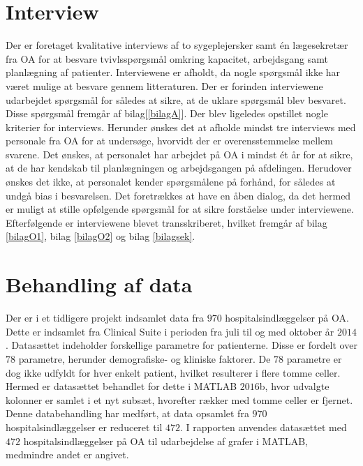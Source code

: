 \section{Interview}
Der er foretaget kvalitative interviews af to sygeplejersker samt én lægesekretær fra OA for at besvare tvivlsspørgsmål omkring kapacitet, arbejdsgang samt planlægning af patienter. Interviewene er afholdt, da nogle spørgsmål ikke har været mulige at besvare gennem litteraturen. Der er forinden interviewene udarbejdet spørgsmål for således at sikre, at de uklare spørgsmål blev besvaret. Disse spørgsmål fremgår af bilag[\ref{bilagA}]. Der blev ligeledes opstillet nogle kriterier for interviews. Herunder ønskes det at afholde mindst tre interviews med personale fra OA for at undersøge, hvorvidt der er overensstemmelse mellem svarene. Det ønskes, at personalet har arbejdet på OA i mindst ét år for at sikre, at de har kendskab til planlægningen og arbejdsgangen på afdelingen. Herudover ønskes det ikke, at personalet kender spørgsmålene på forhånd, for således at undgå bias i besvarelsen. Det foretrækkes at have en åben dialog, da det hermed er muligt at stille opfølgende spørgsmål for at sikre forståelse under interviewene. Efterfølgende er interviewene blevet transskriberet, hvilket fremgår af bilag \ref{bilagO1}, bilag \ref{bilagO2} og bilag \ref{bilagsek}.


\section{Behandling af data}
Der er i et tidligere projekt indsamlet data fra $970$ hospitalsindlæggelser på OA. Dette er indsamlet fra Clinical Suite i perioden fra juli til og med oktober år $2014$. Datasættet indeholder forskellige parametre for patienterne. Disse er fordelt over $78$ parametre, herunder demografiske- og kliniske faktorer. De $78$ parametre er dog ikke udfyldt for hver enkelt patient, hvilket resulterer i flere tomme celler. Hermed er datasættet behandlet for dette i MATLAB $2016$b, hvor udvalgte kolonner er samlet i et nyt subsæt, hvorefter rækker med tomme celler er fjernet. Denne databehandling har medført, at data opsamlet fra $970$ hospitalsindlæggelser er reduceret til $472$. I rapporten anvendes datasættet med $472$ hospitalsindlæggelser på OA til udarbejdelse af grafer i MATLAB, medmindre andet er angivet.